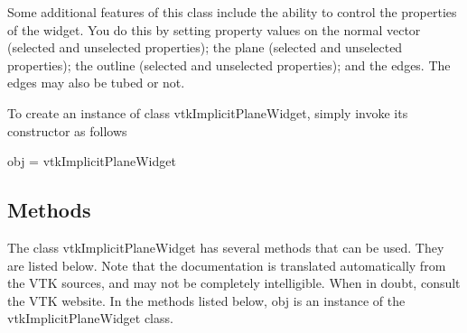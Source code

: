 Some additional features of this class include the ability to control the properties of the widget. You do this by setting property values on the normal vector (selected and unselected properties); the plane (selected and unselected properties); the outline (selected and unselected properties); and the edges. The edges may also be tubed or not.

To create an instance of class vtk\-Implicit\-Plane\-Widget, simply invoke its constructor as follows \begin{DoxyVerb}  obj = vtkImplicitPlaneWidget
\end{DoxyVerb}
 \hypertarget{vtkwidgets_vtkxyplotwidget_Methods}{}\subsection{Methods}\label{vtkwidgets_vtkxyplotwidget_Methods}
The class vtk\-Implicit\-Plane\-Widget has several methods that can be used. They are listed below. Note that the documentation is translated automatically from the V\-T\-K sources, and may not be completely intelligible. When in doubt, consult the V\-T\-K website. In the methods listed below, {\ttfamily obj} is an instance of the vtk\-Implicit\-Plane\-Widget class. 
